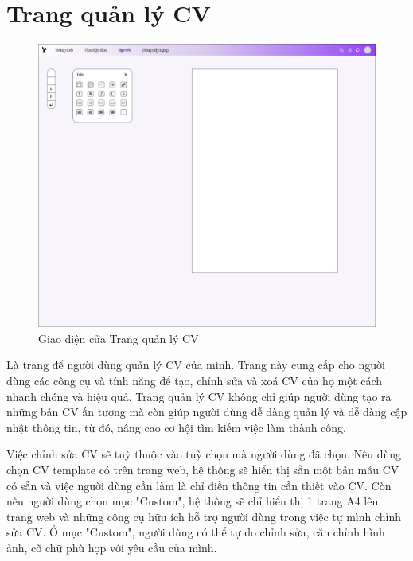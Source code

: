 \section{Trang quản lý CV}

\begin{figure}[H]
\begin{center}
    \includegraphics[scale=0.2]{img/CV_Management.png}
    \caption{Giao diện của Trang quản lý CV}
\end{center}
\end{figure}

Là trang để người dùng quản lý CV của mình. Trang này cung cấp cho người dùng các công cụ và tính năng để tạo, chỉnh sửa và xoá CV của họ một cách nhanh chóng và hiệu quả. Trang quản lý CV không chỉ giúp người dùng tạo ra những bản CV ấn tượng mà còn giúp người dùng dễ dàng quản lý và dễ dàng cập nhật thông tin, từ đó, nâng cao cơ hội tìm kiếm việc làm thành công.

Việc chỉnh sửa CV sẽ tuỳ thuộc vào tuỳ chọn mà người dùng đã chọn. Nếu dùng chọn CV template có trên trang web, hệ thống sẽ hiển thị sẵn một bản mẫu CV có sẵn và việc người dùng cần làm là chỉ điền thông tin cần thiết vào CV. Còn nếu người dùng chọn mục "Custom", hệ thống sẽ chỉ hiển thị 1 trang A4 lên trang web và những công cụ hữu ích hỗ trợ người dùng trong việc tự mình chỉnh sửa CV. Ở mục "Custom", người dùng có thể tự do chỉnh sửa, căn chỉnh hình ảnh, cỡ chữ phù hợp với yêu cầu của mình.



